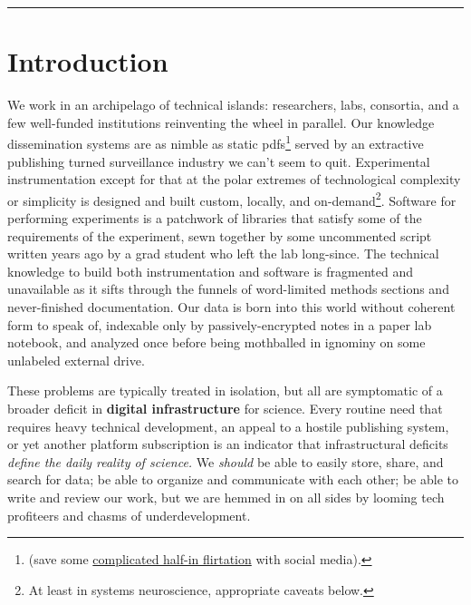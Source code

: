 \begin{center}\rule{0.5\linewidth}{0.5pt}\end{center}

\hypertarget{introduction}{%
\chapter{Introduction}\label{introduction}}

We work in an archipelago of technical islands: researchers, labs,
consortia, and a few well-funded institutions reinventing the wheel in
parallel. Our knowledge dissemination systems are as nimble as static
pdfs\footnote{(save some
  \protect\hyperlink{forums-are-just-one-point-in-a-continuous-feature-space-of-commu}{complicated
  half-in flirtation} with social media).} served by an extractive
publishing turned surveillance industry we can't seem to quit.
Experimental instrumentation except for that at the polar extremes of
technological complexity or simplicity is designed and built custom,
locally, and on-demand\footnote{At least in systems neuroscience,
  appropriate caveats below.}. Software for performing experiments is a
patchwork of libraries that satisfy some of the requirements of the
experiment, sewn together by some uncommented script written years ago
by a grad student who left the lab long-since. The technical knowledge
to build both instrumentation and software is fragmented and unavailable
as it sifts through the funnels of word-limited methods sections and
never-finished documentation. Our data is born into this world without
coherent form to speak of, indexable only by passively-encrypted notes
in a paper lab notebook, and analyzed once before being mothballed in
ignominy on some unlabeled external drive.

These problems are typically treated in isolation, but all are
symptomatic of a broader deficit in \textbf{digital infrastructure} for
science. Every routine need that requires heavy technical development,
an appeal to a hostile publishing system, or yet another platform
subscription is an indicator that infrastructural deficits \emph{define
the daily reality of science.} We \emph{should} be able to easily store,
share, and search for data; be able to organize and communicate with
each other; be able to write and review our work, but we are hemmed in
on all sides by looming tech profiteers and chasms of underdevelopment.

